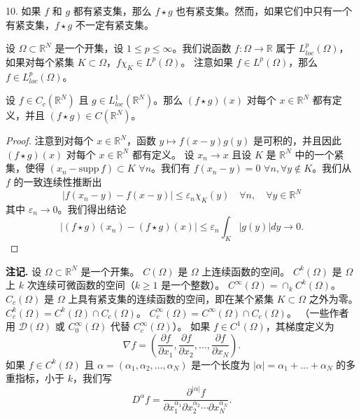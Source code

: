 \begin{remark}
10. 如果 $f$ 和 $g$ 都有紧支集，那么 $f \star g$ 也有紧支集。然而，如果它们中只有一个有紧支集，$f \star g$ 不一定有紧支集。
\end{remark}

\begin{definition}
设 $\Omega \subset \mathbb{R}^N$ 是一个开集，设 $1 \le p \le \infty$。我们说函数 $f: \Omega \to \mathbb{R}$ 属于 $L^p_{loc}(\Omega)$，如果对每个紧集 $K \subset \Omega$，$f\chi_K \in L^p(\Omega)$。
注意如果 $f \in L^p(\Omega)$，那么 $f \in L^p_{loc}(\Omega)$。
\end{definition}

\begin{proposition}\label{proposition4.19}
设 $f \in C_c(\mathbb{R}^N)$ 且 $g \in L^1_{loc}(\mathbb{R}^N)$。那么 $(f \star g)(x)$ 对每个 $x \in \mathbb{R}^N$ 都有定义，并且 $(f \star g) \in C(\mathbb{R}^N)$。
\end{proposition}

\begin{proof}
注意到对每个 $x \in \mathbb{R}^N$，函数 $y \mapsto f(x-y)g(y)$ 是可积的，并且因此 $(f \star g)(x)$ 对每个 $x \in \mathbb{R}^N$ 都有定义。
设 $x_n \to x$ 且设 $K$ 是 $\mathbb{R}^N$ 中的一个紧集，使得 $(x_n-\mathrm{supp}\,f) \subset K$ $\forall n$。我们有 $f(x_n - y) = 0$ $\forall n, \forall y \notin K$。我们从 $f$ 的一致连续性推断出
\[ |f(x_n - y) - f(x-y)| \le \varepsilon_n \chi_K(y) \quad \forall n, \quad \forall y \in \mathbb{R}^N \]
其中 $\varepsilon_n \to 0$。我们得出结论
\[ |(f \star g)(x_n) - (f \star g)(x)| \le \varepsilon_n \int_K |g(y)|dy \to 0. \]
\end{proof}

\textbf{注记.} 设 $\Omega \subset \mathbb{R}^N$ 是一个开集。
$C(\Omega)$ 是 $\Omega$ 上连续函数的空间。
$C^k(\Omega)$ 是 $\Omega$ 上 $k$ 次连续可微函数的空间（$k \ge 1$ 是一个整数）。
$C^\infty(\Omega) = \cap_k C^k(\Omega)$。
$C_c(\Omega)$ 是 $\Omega$ 上具有紧支集的连续函数的空间，即在某个紧集 $K \subset \Omega$ 之外为零。
$C_c^k(\Omega) = C^k(\Omega) \cap C_c(\Omega)$。
$C_c^\infty(\Omega) = C^\infty(\Omega) \cap C_c(\Omega)$。
（一些作者用 $\mathcal{D}(\Omega)$ 或 $C_0^\infty(\Omega)$ 代替 $C_c^\infty(\Omega)$）。
如果 $f \in C^1(\Omega)$，其梯度定义为
\[ \nabla f = \left( \frac{\partial f}{\partial x_1}, \frac{\partial f}{\partial x_2}, \dots, \frac{\partial f}{\partial x_N} \right). \]
如果 $f \in C^k(\Omega)$ 且 $\alpha = (\alpha_1, \alpha_2, \dots, \alpha_N)$ 是一个长度为 $|\alpha| = \alpha_1 + \dots + \alpha_N$ 的多重指标，小于 $k$，我们写
\[ D^\alpha f = \frac{\partial^{|\alpha|} f}{\partial x_1^{\alpha_1} \partial x_2^{\alpha_2} \cdots \partial x_N^{\alpha_N}}. \]

